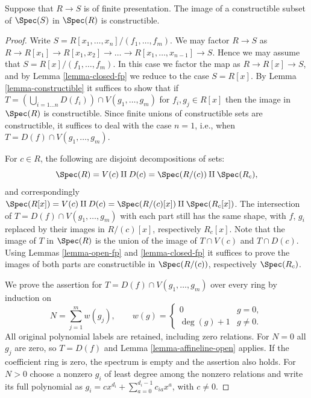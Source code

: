 \begin{theorem}
\label{theorem-chevalley}
Suppose that $R \to S$ is of finite presentation.
The image of a constructible subset of
$\Spec(S)$ in $\Spec(R)$ is constructible.
\end{theorem}

\begin{proof}
Write $S = R[x_1, \ldots, x_n]/(f_1, \ldots, f_m)$.
We may factor $R \to S$ as $R \to R[x_1] \to R[x_1, x_2]
\to \ldots \to R[x_1, \ldots, x_{n-1}] \to S$. Hence
we may assume that $S = R[x]/(f_1, \ldots, f_m)$.
In this case we factor the map as $R \to R[x] \to S$,
and by Lemma \ref{lemma-closed-fp} we reduce to
the case $S = R[x]$. By Lemma \ref{lemma-constructible} it suffices
to show that if
$T = (\bigcup_{i = 1\ldots n} D(f_i)) \cap V(g_1, \ldots, g_m)$
for $f_i , g_j \in R[x]$ then the image in $\Spec(R)$ is
constructible. Since finite unions of constructible sets
are constructible, it suffices to deal with the case $n = 1$,
i.e., when $T = D(f) \cap V(g_1, \ldots, g_m)$.

\medskip\noindent
For $c \in R$, the following are disjoint decompositions of sets:
$$
\Spec(R) =
V(c) \amalg D(c) =
\Spec(R/(c)) \amalg \Spec(R_c),
$$
and correspondingly $\Spec(R[x]) =
V(c) \amalg D(c) = \Spec(R/(c)[x]) \amalg
\Spec(R_c[x])$. The intersection of $T = D(f) \cap V(g_1, \ldots, g_m)$
with each part still has the same shape, with $f$, $g_i$ replaced
by their images in $R/(c)[x]$, respectively $R_c[x]$.
Note that the image of $T$
in $\Spec(R)$ is the union of the image of
$T \cap V(c)$ and $T \cap D(c)$. Using Lemmas \ref{lemma-open-fp}
and \ref{lemma-closed-fp} it suffices to prove the images of both
parts are constructible in $\Spec(R/(c))$, respectively
$\Spec(R_c)$.

\medskip\noindent
We prove the assertion for
$T=D(f)\cap V(g_1,\ldots,g_m)$ over every ring by induction on
$$
N=\sum_{j=1}^m w(g_j),\qquad
w(g)=\begin{cases}0&g=0,\\ \deg(g)+1&g\ne0.\end{cases}
$$
All original polynomial labels are retained, including zero relations.
For $N=0$ all $g_j$ are zero, so $T=D(f)$ and
Lemma \ref{lemma-affineline-open} applies. If the coefficient ring is
zero, the spectrum is empty and the assertion also holds. For $N>0$
choose a nonzero $g_i$ of least degree among the nonzero relations and
write its full polynomial as
$g_i=c x^{d_i}+\sum_{a=0}^{d_i-1}c_{ia}x^a$, with $c\ne0$.


\end{proof}
